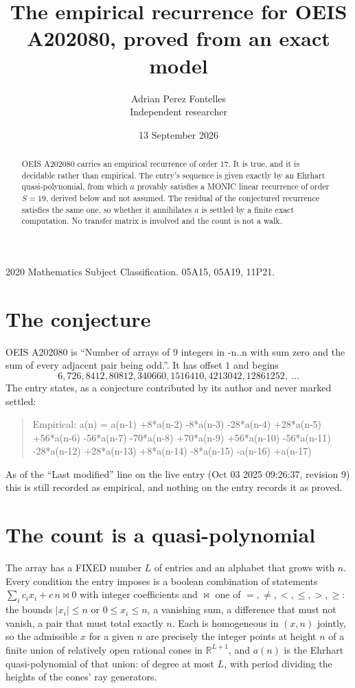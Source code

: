 \documentclass[11pt,a4paper]{article}
\title{The empirical recurrence for OEIS A202080, proved from an exact model}
\author{Adrian Perez Fontelles\\ \small Independent researcher}
\date{13 September 2026}
\theoremstyle{plain}
\theoremstyle{definition}
\begin{document}
\maketitle

\begin{abstract}
OEIS A202080 carries an empirical recurrence of order $17$. It is true, and it is
decidable rather than empirical. The entry's sequence is given exactly by an Ehrhart quasi-polynomial, from
which $a$ provably satisfies a MONIC linear recurrence of order $S=19$, derived below and not
assumed. The residual of the conjectured recurrence satisfies the same one, so whether it
annihilates $a$ is settled by a finite exact computation. No transfer matrix is involved and
the count is not a walk.
\end{abstract}

\noindent\small 2020 Mathematics Subject Classification. 05A15, 05A19, 11P21.\normalsize

\section{The conjecture}

OEIS A202080 is ``Number of arrays of 9 integers in -n..n with sum zero and the sum of every adjacent pair being odd.''. It has offset $1$ and begins
\[
6, 726, 8412, 80812, 340660, 1516410, 4213042, 12861252,\ \dots
\]
The entry states, as a conjecture contributed by its author and never marked settled:
\begin{quote}
Empirical: a(n) = a(n-1) +8*a(n-2) -8*a(n-3) -28*a(n-4) +28*a(n-5) +56*a(n-6) -56*a(n-7) -70*a(n-8) +70*a(n-9) +56*a(n-10) -56*a(n-11) -28*a(n-12) +28*a(n-13) +8*a(n-14) -8*a(n-15) -a(n-16) +a(n-17)
\end{quote}
As of the ``Last modified'' line on the live entry (Oct 03 2025 09:26:37, revision 9)
this is still recorded as empirical, and nothing on the entry records it as proved.

\section{The count is a quasi-polynomial}

The array has a FIXED number $L$ of entries and an alphabet that grows with $n$. Every
condition the entry imposes is a boolean combination of statements
$\sum_i c_ix_i + c\,n \bowtie 0$ with integer coefficients and $\bowtie$ one of
$=,\ne,<,\le,>,\ge$: the bounds $|x_i|\le n$ or $0\le x_i\le n$, a vanishing sum, a difference
that must not vanish, a pair that must total exactly $n$. Each is homogeneous in $(x,n)$
jointly, so the admissible $x$ for a given $n$ are precisely the integer points at height $n$
of a finite union of relatively open rational cones in $\mathbb{R}^{L+1}$, and $a(n)$ is
the Ehrhart quasi-polynomial of that union: of degree at most $L$, with period dividing the
heights of the cones' ray generators.
\end{document}
